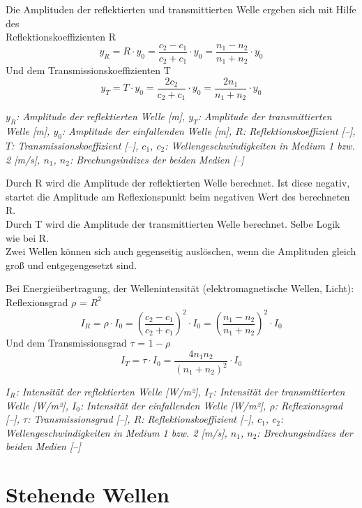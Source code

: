 \documentclass[a4paper,10pt]{article}
\newenvironment{displayformula}
{
	\begin{framed}
		\color{formulaColor}
	}
	{\end{framed}}
\newcommand{\formulalegend}[1]{%
	\par\vspace{0.5ex}%
	{{\color{legendColor}\RaggedRight\small\textit{#1}}}%
	\par\vspace{1.5ex}%
}
\begin{document}
\begin{displayformula}
	Die Amplituden der reflektierten und transmittierten Welle ergeben sich mit Hilfe des \\ Reflektionskoeffizienten R
	\[
	y_R = R \cdot y_0 = \frac{c_2 - c_1}{c_2 + c_1} \cdot y_0 = \frac{n_1 - n_2}{n_1 + n_2} \cdot y_0
	\]
	Und dem Transmissionskoeffizienten T
	\[
	y_T = T \cdot y_0 = \frac{2c_2}{c_2 + c_1} \cdot y_0 = \frac{2n_1}{n_1 + n_2} \cdot y_0
	\]
\end{displayformula}
\formulalegend{
	\( y_R \): Amplitude der reflektierten Welle [m], 
	\( y_T \): Amplitude der transmittierten Welle [m], 
	\( y_0 \): Amplitude der einfallenden Welle [m], 
	\( R \): Reflektionskoeffizient [–], 
	\( T \): Transmissionskoeffizient [–], 
	\( c_1 \), \( c_2 \): Wellengeschwindigkeiten in Medium 1 bzw. 2 [m/s], 
	\( n_1 \), \( n_2 \): Brechungsindizes der beiden Medien [–]
}

Durch R wird die Amplitude der reflektierten Welle berechnet. Ist diese negativ, startet die Amplitude am Reflexionspunkt beim negativen Wert des berechneten R. \\
Durch T wird die Amplitude der transmittierten Welle berechnet. Selbe Logik wie bei R. \\
Zwei Wellen können sich auch gegenseitig auslöschen, wenn die Amplituden gleich groß und entgegengesetzt sind.

\begin{displayformula}
	Bei Energieübertragung, der Wellenintensität (elektromagnetische Wellen, Licht): \\
	Reflexionsgrad $\rho$ = $R^2$
	\[
	I_R = \rho \cdot I_0 = (\frac{c_2 - c_1}{c_2 + c_1})^2 \cdot I_0 = (\frac{n_1 - n_2}{n_1 + n_2})^2 \cdot I_0
	\]
	Und dem Transmissionsgrad $\tau$ =  $1 - \rho$
	\[
	I_T = \tau \cdot I_0 = \frac{4n_1n_2}{(n_1 + n_2)^2} \cdot I_0
	\]
\end{displayformula}
\formulalegend{
	\( I_R \): Intensität der reflektierten Welle [W/m²], 
	\( I_T \): Intensität der transmittierten Welle [W/m²], 
	\( I_0 \): Intensität der einfallenden Welle [W/m²], 
	\( \rho \): Reflexionsgrad [–], 
	\( \tau \): Transmissionsgrad [–], 
	\( R \): Reflektionskoeffizient [–], 
	\( c_1 \), \( c_2 \): Wellengeschwindigkeiten in Medium 1 bzw. 2 [m/s], 
	\( n_1 \), \( n_2 \): Brechungsindizes der beiden Medien [–]
}


\section{Stehende Wellen}
\end{document}
